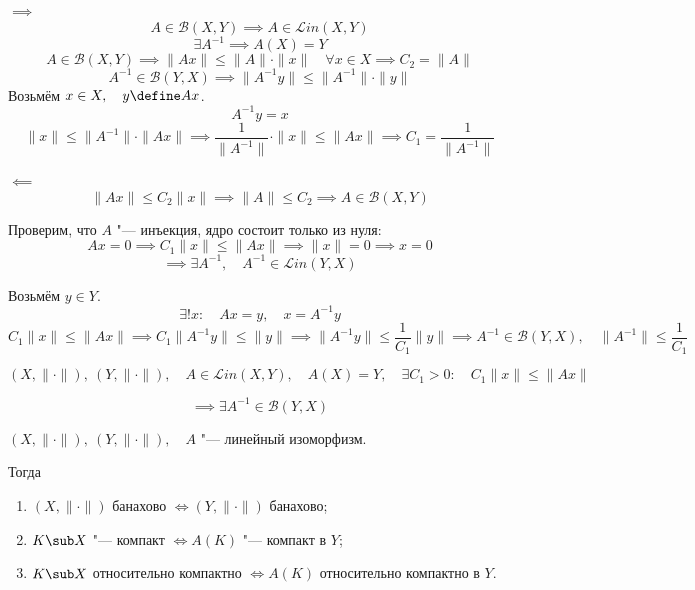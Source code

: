 \begin{iproof}
\item $ \implies $
	$$ A \in \mathscr B(X, Y) \implies A \in \mathscr Lin(X, Y) $$
	$$ \exists A^{-1} \implies A(X) = Y $$
	$$ A \in \mathscr B(X, Y) \implies
	\|Ax\| \le \|A\| \cdot \|x\| \quad \forall x \in X \implies C_2 = \|A\| $$
	$$ A^{-1} \in \mathscr B(Y, X) \implies \|A^{-1}y\| \le \|A^{-1}\| \cdot \|y\| $$
	Возьмём $ x \in X, \quad y \define Ax $.
	$$ A^{-1}y = x $$
	$$ \|x\| \le \|A^{-1}\| \cdot \|Ax\| \implies
	\frac1{\|A^{-1}\|} \cdot \|x\| \le \|Ax\| \implies
	C_1 = \frac1{\|A^{-1}\|} $$
\item $ \impliedby $
	$$ \|Ax\| \le C_2 \|x\| \implies \|A\| \le C_2 \implies A \in \mathscr B(X, Y) $$

	Проверим, что $ A $ "--- инъекция, \ie ядро состоит только из нуля:
	$$ Ax = 0 \implies C_1\|x\| \le \|Ax\| \implies \|x\| = 0 \implies x = 0 $$
	$$ \implies \exists A^{-1}, \quad A^{-1} \in \mathscr Lin (Y, X) $$

	Возьмём $ y \in Y $.
	$$ \exists! x : \quad Ax = y, \quad x = A^{-1}y $$
	$$ C_1\|x\| \le \|Ax\| \implies C_1\|A^{-1}y\| \le \|y\| \implies
	\|A^{-1}y\| \le \frac1{C_1}\|y\| \implies
	A^{-1} \in \mathscr B(Y, X), \quad \|A^{-1}\| \le \frac1{C_1} $$
\end{iproof}

\begin{implication}
	$$ (X, \|\cdot\|), ~ (Y, \|\cdot\|), \quad A \in \mathscr Lin(X, Y), \quad
	A(X) = Y, \quad \exists C_1 > 0 : \quad C_1 \|x\| \le \|Ax\| $$

	$$ \implies \exists A^{-1} \in \mathscr B(Y, X) $$
\end{implication}

\begin{statement}
	$ (X, \|\cdot\|), ~ (Y, \|\cdot\|), \quad A $ "--- линейный изоморфизм.

	Тогда
	\begin{enumerate}
		\item $ (X, \|\cdot\|) $ банахово $ \iff (Y, \|\cdot\|) $ банахово;
		\item $ K \sub X $ "--- компакт $ \iff A(K) $ "--- компакт в $ Y $;
		\item $ K \sub X $ относительно компактно $ \iff A(K) $ относительно компактно в $ Y $.
	\end{enumerate}
\end{statement}

